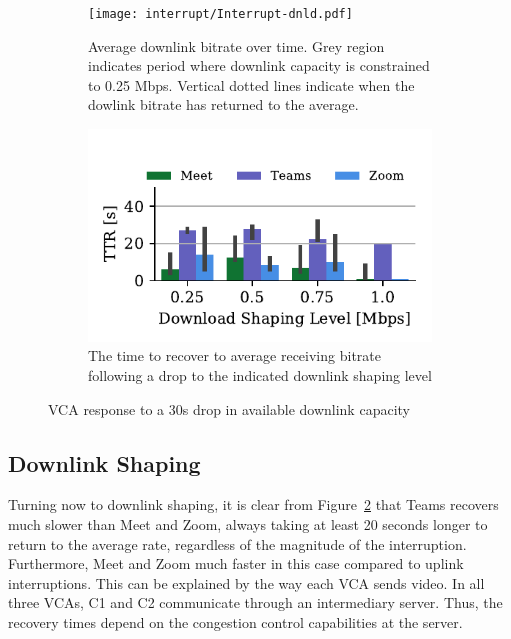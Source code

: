 \begin{figure}[t!]
 \centering
\begin{subfigure}[t]{.5\textwidth}
   \centering
    \texttt{[image: interrupt/Interrupt-dnld.pdf]}
    \caption{Average downlink bitrate over time. Grey region indicates period where downlink capacity is constrained to 0.25 Mbps. Vertical dotted lines indicate when the dowlink bitrate has returned to the average.}
    \label{fig:ts-dnld}
\end{subfigure}
\begin{subfigure}[t]{.5\textwidth}
  \centering
    \includegraphics[width=.9\textwidth,keepaspectratio]{figures/interrupt/TTR-dnld.pdf}
    \caption{The time to recover to average receiving bitrate following a drop to the indicated downlink shaping level}
    \label{fig:TTR_dnld}
\end{subfigure}
\caption{VCA response to a 30s drop in available downlink capacity}
\label{fig:interrupt-dnld}
\end{figure}

\subsection{Downlink Shaping}

Turning now to downlink shaping, it is clear from Figure~\ref{fig:TTR_dnld} that Teams recovers much slower than Meet and Zoom, always taking at least 20 seconds longer to return to the average rate, regardless of the magnitude of the interruption. Furthermore, Meet and Zoom much faster in this case compared to uplink interruptions. This can be explained by the way each VCA sends video. In all three VCAs, C1 and C2 communicate through an intermediary server. Thus, the recovery times depend on the congestion control capabilities at the server. 


